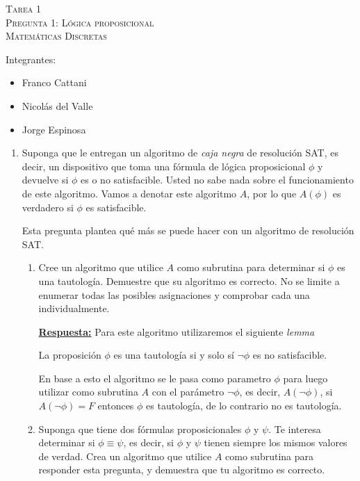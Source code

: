 \documentclass[10pt]{article}
\begin{document}
\begin{center}
    {\Large\textsc{Tarea 1}}\\
    {\small\textsc{Pregunta 1: Lógica proposicional}}\\
    \small{\textsc{Matemáticas Discretas}}
\end{center}

Integrantes:
\begin{itemize}
    \item Franco Cattani
    \item Nicolás del Valle
    \item Jorge Espinosa
\end{itemize}

\begin{enumerate}
    \item Suponga que le entregan un algoritmo de \textit{caja negra}
    de resolución SAT, es decir, un dispositivo que toma una fórmula de 
    lógica proposicional $\phi$ y devuelve si $\phi$ es o no satisfacible.
    Usted no sabe nada sobre el funcionamiento de este algoritmo. Vamos a 
    denotar este algoritmo $A$, por lo que $A(\phi)$ es verdadero si $\phi$
    es satisfacible.

    Esta pregunta plantea qué más se puede hacer con un algoritmo de 
    resolución SAT.
    \begin{enumerate}
        \item Cree un algoritmo que utilice $A$ como subrutina para determinar 
         si $\phi$ es una tautología. Demuestre que su algoritmo es correcto. 
         No se limite a enumerar todas las posibles asignaciones y comprobar cada una individualmente.

        \textbf{\underline{Respuesta:}} Para este algoritmo utilizaremos el siguiente \textit{lemma}

        \begin{tcolorbox}[title=\textit{Lemma}]
            La proposición $\phi$ es una tautología si y solo sí $\neg\phi$ es no 
            satisfacible.
        \end{tcolorbox}
         
        En base a esto el algoritmo se le pasa como parametro $\phi$ para luego utilizar como subrutina 
        $A$ con el parámetro $\neg\phi$, es decir, $A(\neg\phi)$, si $A(\neg\phi)=F$ entonces $\phi$
         es tautología, de lo contrario no es tautología.

         \item Suponga que tiene dos fórmulas proposicionales $\phi$ y $\psi$. Te interesa determinar 
         si $\phi \equiv \psi$, es decir, si $\phi$ y $\psi$ tienen siempre los mismos valores de verdad.
        Crea un algoritmo que utilice $A$ como subrutina para responder esta pregunta, y demuestra que tu 
        algoritmo es correcto.
        

\end{enumerate}
\end{enumerate}
\end{document}
